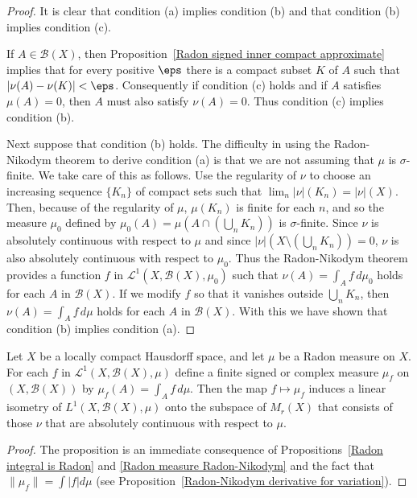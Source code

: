 \begin{proof}
It is clear that condition (a) implies condition (b) and that condition (b) implies condition (c).\par
If $A\in\mathcal{B}(X)$, then Proposition~\ref{Radon signed inner compact approximate} implies that for every positive $\eps$ there is a compact subset $K$ of $A$ such that $|\nu(A)-\nu(K)|<\eps$. Consequently if condition (c) holds and if $A$ satisfies $\mu(A)=0$, then $A$ must also satisfy $\nu(A)=0$. Thus condition (c) implies condition (b).\par
Next suppose that condition (b) holds. The difficulty in using the Radon-Nikodym theorem to derive condition (a) is that we are not assuming that $\mu$ is $\sigma$-finite. We take care of this as follows. Use the regularity of $\nu$ to choose an increasing sequence $\{K_n\}$ of compact sets such that $\lim_n|\nu|(K_n)=|\nu|(X)$. Then, because of the regularity of $\mu$, $\mu(K_n)$ is finite for each $n$, and so the measure $\mu_0$ defined by $\mu_0(A)=\mu(A\cap(\bigcup_nK_n))$ is $\sigma$-finite. Since $\nu$ is absolutely continuous with respect to $\mu$ and since $|\nu|(X\setminus(\bigcup_nK_n))=0$, $\nu$ is also absolutely continuous with respect to $\mu_0$. Thus the Radon-Nikodym theorem provides a function $f$ in $\mathcal{L}^1(X,\mathcal{B}(X),\mu_0)$ such that $\nu(A)=\int_Af\,d\mu_0$ holds for each $A$ in $\mathcal{B}(X)$. If we modify $f$ so that it vanishes outside $\bigcup_nK_n$, then $\nu(A)=\int_Af\,d\mu$ holds for each $A$ in $\mathcal{B}(X)$. With this we have shown that condition (b) implies condition (a).
\end{proof}
\begin{proposition}\label{Radon measure L^1 embedd to M_r}
Let $X$ be a locally compact Hausdorff space, and let $\mu$ be a Radon measure on $X$. For each $f$ in $\mathcal{L}^1(X,\mathcal{B}(X),\mu)$ define a finite signed or complex measure $\mu_f$ on $(X,\mathcal{B}(X))$ by $\mu_f(A)=\int_Af\,d\mu$. Then the map $f\mapsto\mu_f$ induces a linear isometry of $L^1(X,\mathcal{B}(X),\mu)$ onto the subspace of $M_r(X)$ that consists of those $\nu$ that are absolutely continuous with respect to $\mu$.
\end{proposition}
\begin{proof}
The proposition is an immediate consequence of Propositions~\ref{Radon integral is Radon} and \ref{Radon measure Radon-Nikodym} and the fact that $\|\mu_f\|=\int|f|d\mu$ (see Proposition~\ref{Radon-Nikodym derivative for variation}).
\end{proof}
